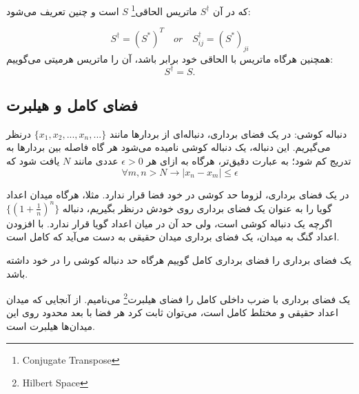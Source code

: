 که در آن $S^{\dagger}$ ماتریس الحاقی\footnote{Conjugate Transpose} $S$ است و چنین تعریف می‌شود:

\begin{equation}
S^{\dagger} = (S^{*})^{T} \quad or \quad S^{\dagger}_{ij} = (S^{*})_{ji}
\end{equation}
همچنین هرگاه ماتریس با الحاقی خود برابر باشد، آن را ماتریس هرمیتی می‌گوییم: 
\begin{equation}
	S^{\dagger} = S.
\end{equation}

\subsection{فضای کامل و هیلبرت}
\begin{definition}{دنباله کوشی:}
در یک فضای برداری، دنباله‌ای از بردارها مانند $\{x_{1},x_{2},...,x_{n},...\}$  درنظر می‌گیریم. این دنباله، یک دنباله کوشی نامیده می‌شود هر گاه فاصله بین  بردارها به تدریج کم شود؛ به عبارت دقیق‌تر، هرگاه به ازای هر $\epsilon > 0$ عددی مانند $N$ یافت شود که 
\begin{equation}
	\forall m,n > N \rightarrow |x_{n} - x_{m} | \leq \epsilon
\end{equation} 
\end{definition}
در یک فضای برداری، لزوما حد کوشی در خود فضا قرار ندارد. مثلا، هرگاه میدان اعداد گویا را به عنوان یک فضای برداری روی خودش درنظر بگیریم، دنباله $\{ ( 1 + \frac{1}{n})^{n} \}$ اگرچه یک دنباله کوشی است، ولی حد آن در میان اعداد گویا قرار ندارد. با افزودن اعداد گنگ به میدان، یک فضای برداری میدان حقیقی به دست می‌آید که کامل است. 

\begin{definition}
یک فضای برداری را فضای برداری کامل گوییم هرگاه حد دنباله کوشی را در خود داشته باشد. 
\end{definition}
 
\begin{definition}
 یک فضای برداری با ضرب داخلی کامل را فضای هیلبرت\footnote{Hilbert Space}  می‌نامیم. از آنجایی که میدان اعداد حقیقی و مختلط کامل است، می‌توان ثابت کرد هر فضا با بعد محدود روی این میدان‌ها هیلبرت است. 
 \end{definition}
 
